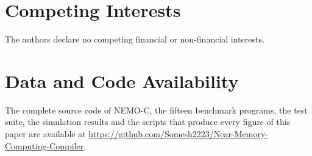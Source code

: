 \documentclass{ieeeaccess}
\begin{document}
\section*{Competing Interests}
The authors declare no competing financial or non-financial interests.

\section*{Data and Code Availability}
The complete source code of NEMO-C, the fifteen benchmark programs, the test suite, the simulation results and the scripts that produce every figure of this paper are available at \url{https://github.com/Somesh2223/Near-Memory-Computing-Compiler}.

\end{document}
